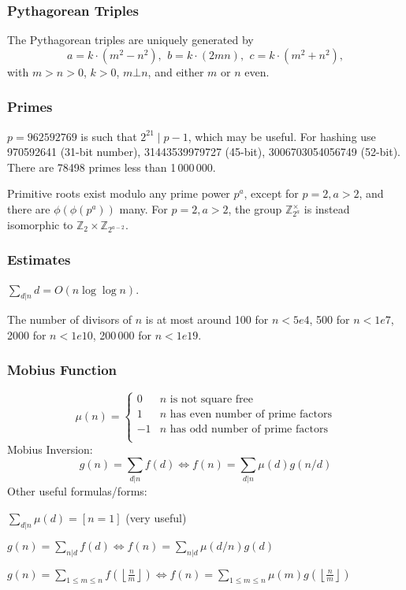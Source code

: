 \documentclass[
	a4paper,
	landscape,
	10pt,
]{article}
\begin{document}
\begin{multicols}{3}
\subsubsection*{Pythagorean Triples}
 The Pythagorean triples are uniquely generated by
 \[ a=k\cdot (m^{2}-n^{2}),\ \,b=k\cdot (2mn),\ \,c=k\cdot (m^{2}+n^{2}), \]
 with $m > n > 0$, $k > 0$, $m \bot n$, and either $m$ or $n$ even.

\subsubsection*{Primes}
	$p=962592769$ is such that $2^{21} \mid p-1$, which may be useful. For hashing
	use 970592641 (31-bit number), 31443539979727 (45-bit), 3006703054056749
	(52-bit). There are 78498 primes less than 1\,000\,000.

	Primitive roots exist modulo any prime power $p^a$, except for $p = 2, a > 2$, and there are $\phi(\phi(p^a))$ many.
	For $p = 2, a > 2$, the group $\mathbb Z_{2^a}^\times$ is instead isomorphic to $\mathbb Z_2 \times \mathbb Z_{2^{a-2}}$.

\subsubsection*{Estimates}
	$\sum_{d|n} d = O(n \log \log n)$.

	The number of divisors of $n$ is at most around 100 for $n < 5e4$, 500 for $n < 1e7$, 2000 for $n < 1e10$, 200\,000 for $n < 1e19$.

\subsubsection*{Mobius Function}
\[
	\mu(n) = \begin{cases} 0 & n \textrm{ is not square free}\\ 1 & n \textrm{ has even number of prime factors}\\ -1 & n \textrm{ has odd number of prime factors}\\\end{cases}
\]
  Mobius Inversion:
  \[ g(n) = \sum_{d|n} f(d) \Leftrightarrow f(n) = \sum_{d|n} \mu(d)g(n/d) \]
  Other useful formulas/forms:

  $ \sum_{d | n} \mu(d) = [ n = 1] $ (very useful)

  $ g(n) = \sum_{n|d} f(d) \Leftrightarrow f(n) = \sum_{n|d} \mu(d/n)g(d)$

 $ g(n) = \sum_{1 \leq m \leq n} f(\left\lfloor\frac{n}{m}\right \rfloor ) \Leftrightarrow f(n) = \sum_{1\leq m\leq n} \mu(m)g(\left\lfloor\frac{n}{m}\right\rfloor)$




\end{multicols}
\end{document}
